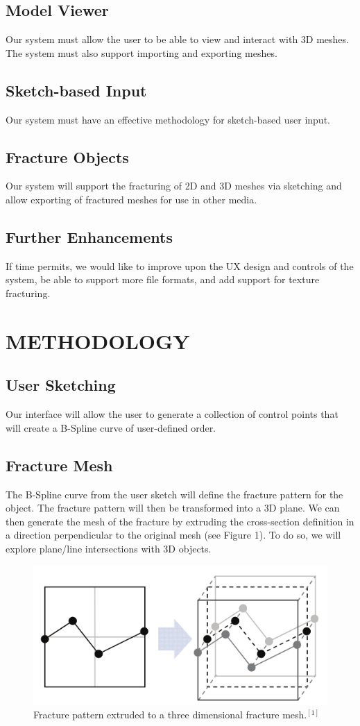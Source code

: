 \documentclass[titlepage, 11pt]{article}
\begin{document}
\subsection{Model Viewer}
Our system must allow the user to be able to view and interact with 3D meshes. The system must also support importing and exporting meshes.
\subsection{Sketch-based Input}
Our system must have an effective methodology for sketch-based user input.
\subsection{Fracture Objects}
Our system will support the fracturing of 2D and 3D meshes via sketching and allow exporting of fractured meshes for use in other media.
\subsection{Further Enhancements}
If time permits, we would like to improve upon the UX design and controls of the system, be able to support more file formats, and add support for texture fracturing.
\section{METHODOLOGY}
\subsection{User Sketching}
Our interface will allow the user to generate a collection of control points that will create a B-Spline curve of user-defined order.
\subsection{Fracture Mesh}
The B-Spline curve from the user sketch will define the fracture pattern for the object. The fracture pattern will then be transformed into a 3D plane. We can then generate the mesh of the fracture by extruding the cross-section definition in a direction perpendicular to the original mesh (see Figure 1). To do so, we will explore plane/line intersections with 3D objects.
\begin{figure}
\begin{center}
\includegraphics[scale=0.4]{fracture_pattern.png}
\caption{Fracture pattern extruded to a three dimensional fracture mesh.$^{[1]}$}
\end{center}
\end{figure}
\end{document}
